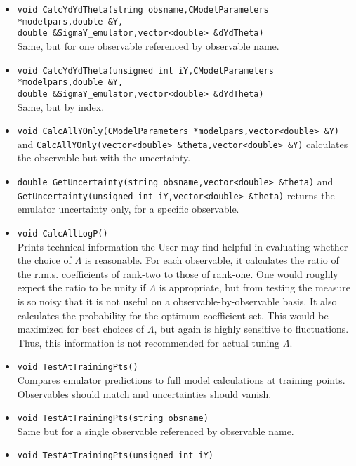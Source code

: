 \documentclass[UserManual.tex]{subfiles}
\begin{document}
\begin{itemize}
{vector<double> \&SigmaY\_emulator,vector<vector<double>> \&dYdTheta)}\\
Also calculates derivatives w.r.t. $\vec{\theta}$. Especially useful for some Markov chain searches in parameter space, e.g. Langevin approaches.
\item {\tt void CalcYdYdTheta(string obsname,CModelParameters *modelpars,double \&Y,\\double \&SigmaY\_emulator,vector<double> \&dYdTheta)}\\
Same, but for one observable referenced by observable name.
\item {\tt void CalcYdYdTheta(unsigned int iY,CModelParameters *modelpars,double \&Y,\\double \&SigmaY\_emulator,vector<double> \&dYdTheta)}\\
Same, but by index.
\item {\tt void CalcAllYOnly(CModelParameters *modelpars,vector<double> \&Y)} and {\tt CalcAllYOnly(vector<double> \&theta,vector<double> \&Y)} calculates the observable but with the uncertainty.
\item {\tt double GetUncertainty(string obsname,vector<double> \&theta)} and {\tt GetUncertainty(unsigned int iY,vector<double> \&theta)} returns the emulator uncertainty only, for a specific observable.		
\item {\tt void CalcAllLogP()}\\
Prints technical information the User may find helpful in evaluating whether the choice of $\Lambda$ is reasonable. For each observable, it calculates the ratio of the r.m.s. coefficients of rank-two to those of rank-one. One would roughly expect the ratio to be unity if $\Lambda$ is appropriate, but from testing the measure is so noisy that it is not useful on a observable-by-observable basis. It also calculates the probability for the optimum coefficient set. This would be maximized for best choices of $\Lambda$, but again is highly sensitive to fluctuations. Thus, this information is not recommended for actual tuning $\Lambda$.
\item {\tt void TestAtTrainingPts()}\\
Compares emulator predictions to full model calculations at training points. Observables should match and uncertainties should vanish.
\item {\tt void TestAtTrainingPts(string obsname)}\\
Same but for a single observable referenced by observable name.
\item {\tt void TestAtTrainingPts(unsigned int iY)}\\

\end{itemize}
\end{document}
